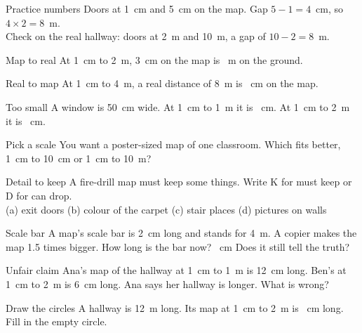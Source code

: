 \begin{worked}{Practice numbers}
Doors at 1~cm and 5~cm on the map. Gap $5-1=4$~cm, so $4\times2=8$~m.\\
Check on the real hallway: doors at 2~m and 10~m, a gap of $10-2=8$~m.
\end{worked}

\clearpage

\begin{puzzle}{Map to real}
At 1~cm to 2~m, 3~cm on the map is \wline[1.6cm]~m on the ground.
\end{puzzle}

\begin{puzzle}{Real to map}
At 1~cm to 4~m, a real distance of 8~m is \wline[1.6cm]~cm on the map.
\end{puzzle}

\begin{puzzle}{Too small}
A window is 50~cm wide. At 1~cm to 1~m it is \wline[1.6cm]~cm. At 1~cm to 2~m it is \wline[1.6cm]~cm.
\end{puzzle}

\begin{puzzle}{Pick a scale}
You want a poster-sized map of one classroom. Which fits better, 1~cm to 10~cm or 1~cm to 10~m? \wline[3cm]
\end{puzzle}

\begin{puzzle}{Detail to keep}
A fire-drill map must keep some things. Write K for must keep or D for can drop.\\
(a) exit doors \wline[1cm] \quad (b) colour of the carpet \wline[1cm] \quad (c) stair places \wline[1cm] \quad (d) pictures on walls \wline[1cm]
\end{puzzle}

\clearpage

\begin{puzzle}{Scale bar}
A map's scale bar is 2~cm long and stands for 4~m. A copier makes the map 1.5 times bigger. How long is the bar now? \wline[1.6cm]~cm Does it still tell the truth? \wline[2cm]
\end{puzzle}

\begin{puzzle}{Unfair claim}
Ana's map of the hallway at 1~cm to 1~m is 12~cm long. Ben's at 1~cm to 2~m is 6~cm long. Ana says her hallway is longer. What is wrong? \wline[6cm]
\end{puzzle}

\begin{puzzle}{Draw the circles}
A hallway is 12~m long. Its map at 1~cm to 2~m is \wline[1.2cm]~cm long. Fill in the empty circle.
\begin{center}
\end{center}
\end{puzzle}

